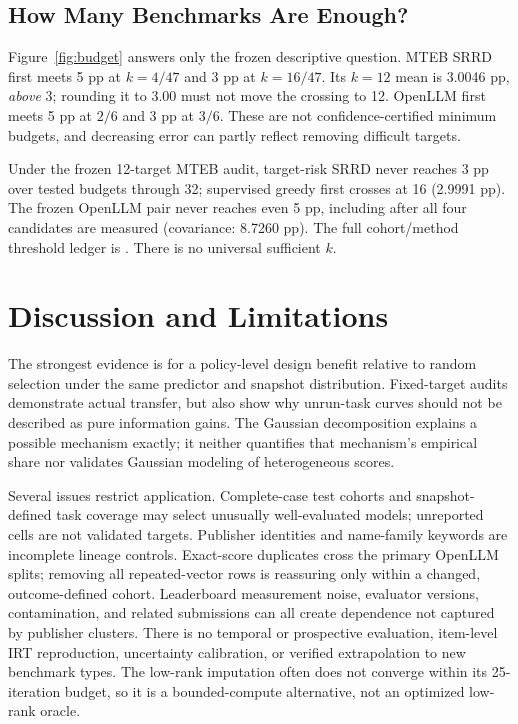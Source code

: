 \documentclass{article}
\newcommand{\artifact}[1]{\path{#1}}
\begin{document}
\subsection{How Many Benchmarks Are Enough?}
Figure~\ref{fig:budget} answers only the frozen descriptive question. MTEB SRRD first meets 5 pp at $k=4/47$ and 3 pp at $k=16/47$. Its $k=12$ mean is 3.0046 pp, \emph{above} 3; rounding it to 3.00 must not move the crossing to 12. OpenLLM first meets 5 pp at $2/6$ and 3 pp at $3/6$. These are not confidence-certified minimum budgets, and decreasing error can partly reflect removing difficult targets.

Under the frozen 12-target MTEB audit, target-risk SRRD never reaches 3 pp over tested budgets through 32; supervised greedy first crosses at 16 (2.9991 pp). The frozen OpenLLM pair never reaches even 5 pp, including after all four candidates are measured (covariance: 8.7260 pp). The full cohort/method threshold ledger is \artifact{artifacts/analysis/budget_thresholds.csv}. There is no universal sufficient $k$.

\section{Discussion and Limitations}
\label{sec:discussion}
The strongest evidence is for a policy-level design benefit relative to random selection under the same predictor and snapshot distribution. Fixed-target audits demonstrate actual transfer, but also show why unrun-task curves should not be described as pure information gains. The Gaussian decomposition explains a possible mechanism exactly; it neither quantifies that mechanism's empirical share nor validates Gaussian modeling of heterogeneous scores.

Several issues restrict application. Complete-case test cohorts and snapshot-defined task coverage may select unusually well-evaluated models; unreported cells are not validated targets. Publisher identities and name-family keywords are incomplete lineage controls. Exact-score duplicates cross the primary OpenLLM splits; removing all repeated-vector rows is reassuring only within a changed, outcome-defined cohort. Leaderboard measurement noise, evaluator versions, contamination, and related submissions can all create dependence not captured by publisher clusters. There is no temporal or prospective evaluation, item-level IRT reproduction, uncertainty calibration, or verified extrapolation to new benchmark types. The low-rank imputation often does not converge within its 25-iteration budget, so it is a bounded-compute alternative, not an optimized low-rank oracle.
\end{document}
